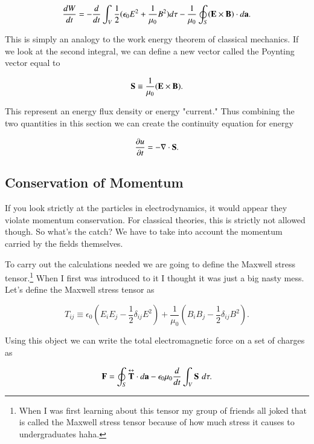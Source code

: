 \documentclass[preprint, review,12pt]{elsarticle}
\def\x{\times}
\def\.{\cdot}
\def\b{\textbf}
\def\={\equiv}
\def\div{\nabla \.}
\newcommand{\pd}[2]{\frac{\partial #1 }{\partial #2}}
\newcommand{\td}[2]{\frac{d #1 }{d #2}}
\newcommand{\tup}[1]{\overset{\text{\tiny $\bm\leftrightarrow $}}{\b #1}}
\begin{document}
\begin{equation}
    \td{W}{t} = - \td{}{t} \int_V \frac{1}{2}(\epsilon_0 E^2 + \frac{1}{\mu_0} B^2) d\tau - \frac{1}{\mu_0} \oint_S (\b E \x \b B) \. d\b a.
\end{equation}

This is simply an analogy to the work energy theorem of classical mechanics. If we look at the second integral, we can define a new vector called the Poynting vector equal to

\begin{equation}
    \b S \= \frac{1}{\mu_0} (\b E \x \b B).
\end{equation}

This represent an energy flux density or energy "current." Thus combining the two quantities in this section we can create the continuity equation for energy

\begin{equation}
    \pd{u}{t} = - \div \b S.    
\end{equation}

\subsection{Conservation of Momentum}

If you look strictly at the particles in electrodynamics, it would appear they violate momentum conservation. For classical theories, this is strictly not allowed though. So what's the catch? We have to take into account the momentum carried by the fields themselves. 

To carry out the calculations needed we are going to define the Maxwell stress tensor.\footnote{When I was first learning about this tensor my group of friends all joked that is called the Maxwell stress tensor because of how much stress it causes to undergraduates haha.} When I first was introduced to it I thought it was just a big nasty mess. Let's define the Maxwell stress tensor as

\begin{equation}
    T_{ij} \= \epsilon_0 (E_iE_j - \frac{1}{2}\delta_{ij}E^2) + \frac{1}{\mu_0}(B_iB_j - \frac{1}{2}\delta_{ij}B^2).
\end{equation}

Using this object we can write the total electromagnetic force on a set of charges as 

\begin{equation}
\label{mompoyn}
    \b F = \oint_S \tup{T} \. d\b a - \epsilon_0 \mu_0 \td{}{t} \int_V \b S \hspace{3.5pt} d\tau.
\end{equation}
\end{document}
